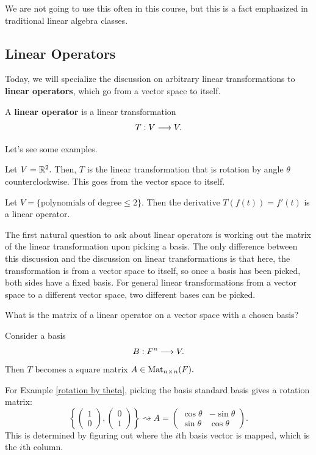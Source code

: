 We are not going to use this often in this course, but this is a fact emphasized in traditional linear algebra classes. 

\subsection{Linear Operators}

Today, we will specialize the discussion on arbitrary linear transformations to \textbf{linear operators}, which go from a vector space to itself.

\begin{definition}
A \textbf{linear operator} is a linear transformation \[T: V \longrightarrow V.\] 
\end{definition}

Let's see some examples.
\begin{example}\label{rotation by theta}
Let $V = \mathbb R^2.$ Then, $T$ is the linear transformation that is rotation by angle $\theta$ counterclockwise. This goes from the vector space to itself.
\end{example}

\begin{example}\label{derivative}
Let $V = \{\text{polynomials of degree} \leq 2\}.$ Then the derivative $T(f(t)) = f'(t)$ is a linear operator.
\end{example}

The first natural question to ask about linear operators is working out the matrix of the linear transformation upon picking a basis. The only difference between this discussion and the discussion on linear transformations is that here, the transformation is from a vector space to itself, so once a basis has been picked, both sides have a fixed basis. For general linear transformations from a vector space to a different vector space, two different bases can be picked. 

\begin{qq}
What is the matrix of a linear operator on a vector space with a chosen basis?
\end{qq}

Consider a basis \[B: F^n \longrightarrow V.\] Then $T$ becomes a square matrix $A \in \text{Mat}_{n \hspace{0.05em}{\times}\hspace{0.05em} n}(F).$ 

For Example \ref{rotation by theta}, picking the basis standard basis gives a rotation matrix: \[\left\{\begin{pmatrix}1 \\ 0\end{pmatrix}, \begin{pmatrix}0 \\ 1\end{pmatrix}\right\} \rightsquigarrow A = \begin{pmatrix} \cos\theta & -\sin\theta \\ \sin\theta & \cos\theta\end{pmatrix}.\] This is determined by figuring out where the $i$th basis vector is mapped, which is the $i$th column.

